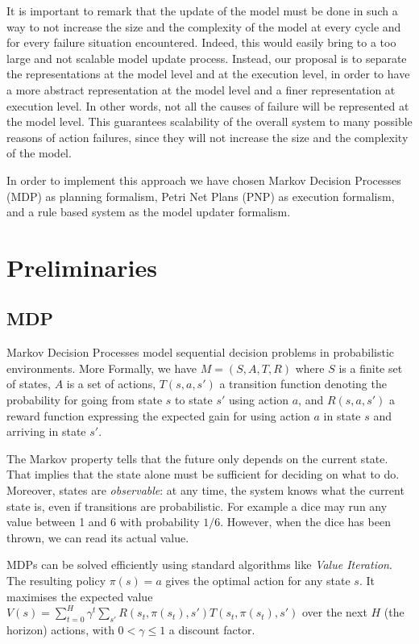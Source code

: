 It is important to remark that the update of the model must be done in such a way to not increase the size and the complexity of the model at every cycle and for every failure situation encountered. Indeed, this would easily bring to a too large and not scalable model update process. Instead, our proposal is to separate the representations at the model level and at the execution level, in order to have a more abstract representation at the model level and a finer representation at execution level.
In other words, not all the causes of failure will be represented at the model level. This guarantees scalability of the overall system to many possible reasons of action failures,
since they will not increase the size and the complexity of the model.

In order to implement this approach we have chosen Markov Decision Processes (MDP) as planning formalism, Petri Net Plans (PNP) as execution formalism, and a rule based system as the model updater formalism.

\section{Preliminaries}

\subsection{MDP}

Markov Decision Processes model sequential decision problems in probabilistic environments. More Formally, we have $M=(S,A,T,R)$ where $S$ is a finite set of states, $A$ is a set of actions, $T(s,a,s')$ a transition function denoting the probability for going from state $s$ to state $s'$ using action $a$, and $R(s,a,s')$ a reward function expressing the expected gain for using action $a$ in state $s$ and arriving in state $s'$.

The Markov property tells that the future only depends on the current state. That implies that the state alone must be sufficient for deciding on what to do.
Moreover, states are \emph{observable}: at any time, the system knows what the current state is, even if transitions are probabilistic. For example a dice may run any value between 1 and 6 with probability $1/6$. However, when the dice has been thrown, we can read its actual value.

MDPs can be solved efficiently using standard algorithms like \emph{Value Iteration}. The resulting policy $\pi(s)=a$ gives the optimal action for any state $s$. It maximises the expected value $V(s)=\sum_{t=0}^H{\gamma^t \sum_{s'}{R(s_t,\pi(s_t),s') T(s_t,\pi(s_t),s')}}$ over the next $H$ (the horizon) actions, with $0<\gamma\le1$ a discount factor.

